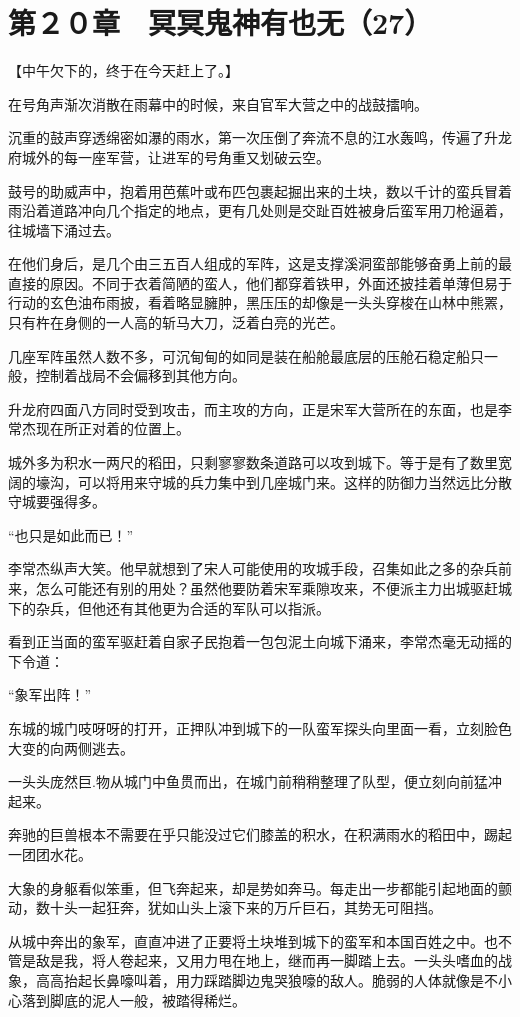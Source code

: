 \section{第２０章　冥冥鬼神有也无（27）}

【中午欠下的，终于在今天赶上了。】

在号角声渐次消散在雨幕中的时候，来自官军大营之中的战鼓擂响。

沉重的鼓声穿透绵密如瀑的雨水，第一次压倒了奔流不息的江水轰鸣，传遍了升龙府城外的每一座军营，让进军的号角重又划破云空。

鼓号的助威声中，抱着用芭蕉叶或布匹包裹起掘出来的土块，数以千计的蛮兵冒着雨沿着道路冲向几个指定的地点，更有几处则是交趾百姓被身后蛮军用刀枪逼着，往城墙下涌过去。

在他们身后，是几个由三五百人组成的军阵，这是支撑溪洞蛮部能够奋勇上前的最直接的原因。不同于衣着简陋的蛮人，他们都穿着铁甲，外面还披挂着单薄但易于行动的玄色油布雨披，看着略显臃肿，黑压压的却像是一头头穿梭在山林中熊罴，只有杵在身侧的一人高的斩马大刀，泛着白亮的光芒。

几座军阵虽然人数不多，可沉甸甸的如同是装在船舱最底层的压舱石稳定船只一般，控制着战局不会偏移到其他方向。

升龙府四面八方同时受到攻击，而主攻的方向，正是宋军大营所在的东面，也是李常杰现在所正对着的位置上。

城外多为积水一两尺的稻田，只剩寥寥数条道路可以攻到城下。等于是有了数里宽阔的壕沟，可以将用来守城的兵力集中到几座城门来。这样的防御力当然远比分散守城要强得多。

“也只是如此而已！”

李常杰纵声大笑。他早就想到了宋人可能使用的攻城手段，召集如此之多的杂兵前来，怎么可能还有别的用处？虽然他要防着宋军乘隙攻来，不便派主力出城驱赶城下的杂兵，但他还有其他更为合适的军队可以指派。

看到正当面的蛮军驱赶着自家子民抱着一包包泥土向城下涌来，李常杰毫无动摇的下令道：

“象军出阵！”

东城的城门吱呀呀的打开，正押队冲到城下的一队蛮军探头向里面一看，立刻脸色大变的向两侧逃去。

一头头庞然巨.物从城门中鱼贯而出，在城门前稍稍整理了队型，便立刻向前猛冲起来。

奔驰的巨兽根本不需要在乎只能没过它们膝盖的积水，在积满雨水的稻田中，踢起一团团水花。

大象的身躯看似笨重，但飞奔起来，却是势如奔马。每走出一步都能引起地面的颤动，数十头一起狂奔，犹如山头上滚下来的万斤巨石，其势无可阻挡。

从城中奔出的象军，直直冲进了正要将土块堆到城下的蛮军和本国百姓之中。也不管是敌是我，将人卷起来，又用力甩在地上，继而再一脚踏上去。一头头嗜血的战象，高高抬起长鼻嚎叫着，用力踩踏脚边鬼哭狼嚎的敌人。脆弱的人体就像是不小心落到脚底的泥人一般，被踏得稀烂。

